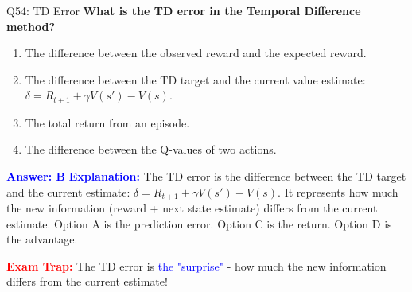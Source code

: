 \documentclass[8pt]{beamer}
\begin{document}
	\begin{frame}{Q54: TD Error}
		\fontsize{6.5}{7.5}\selectfont
		\textbf{What is the TD error in the Temporal Difference method?}
		
		\begin{enumerate}
			\item The difference between the observed reward and the expected reward.
			\item The difference between the TD target and the current value estimate: $\delta = R_{t+1} + \gamma V(s') - V(s)$.
			\item The total return from an episode.
			\item The difference between the Q-values of two actions.
		\end{enumerate}
		
		\vspace{0.1cm}
		\textcolor{blue}{\textbf{Answer: B}}
		\vspace{0.1cm}
		\textcolor{blue}{\textbf{Explanation:}} The TD error is the difference between the TD target and the current estimate: $\delta = R_{t+1} + \gamma V(s') - V(s)$. It represents how much the new information (reward + next state estimate) differs from the current estimate. Option A is the prediction error. Option C is the return. Option D is the advantage.
		
		\textcolor{red}{\textbf{Exam Trap:}} The TD error is \textcolor{blue}{the "surprise"} - how much the new information differs from the current estimate!
	\end{frame}
	
\end{document}
